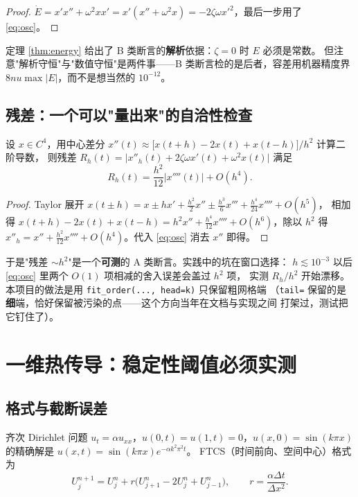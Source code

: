 \begin{proof}
$\dot E=x'x''+\omega^2xx'=x'(x''+\omega^2x)=-2\zeta\omega x'^2$，最后一步用了 \eqref{eq:osc}。
\end{proof}

定理 \ref{thm:energy} 给出了 B 类断言的\textbf{解析}依据：$\zeta=0$ 时 $E$ 必须是常数。
但注意"解析守恒"与"数值守恒"是两件事——B 类断言检的是后者，容差用机器精度界
$8nu\max|E|$，而不是想当然的 $10^{-12}$。

\subsection{残差：一个可以"量出来"的自洽性检查}

\begin{theorem}[中心差分残差的阶]
\label{thm:residual}
设 $x\in C^4$，用中心差分
$x''(t)\approx \bigl[x(t+h)-2x(t)+x(t-h)\bigr]/h^2$ 计算二阶导数，
则残差 $R_h(t)=\bigl|x''_h(t)+2\zeta\omega x'(t)+\omega^2x(t)\bigr|$ 满足
\[
  R_h(t)=\frac{h^2}{12}\bigl|x''''(t)\bigr|+O(h^4).
\]
\end{theorem}

\begin{proof}
Taylor 展开 $x(t\pm h)=x\pm hx'+\tfrac{h^2}{2}x''\pm\tfrac{h^3}{6}x'''+\tfrac{h^4}{24}x''''+O(h^5)$，
相加得 $x(t+h)-2x(t)+x(t-h)=h^2x''+\tfrac{h^4}{12}x''''+O(h^6)$，除以 $h^2$ 得
$x''_h=x''+\tfrac{h^2}{12}x''''+O(h^4)$。代入 \eqref{eq:osc} 消去 $x''$ 即得。
\end{proof}

于是"残差 $\sim h^2$"是一个\textbf{可测}的 A 类断言。实践中的坑在窗口选择：
$h\lesssim10^{-3}$ 以后 \eqref{eq:osc} 里两个 $O(1)$ 项相减的舍入误差会盖过 $h^2$ 项，
实测 $R_h/h^2$ 开始漂移。本项目的做法是用 \texttt{fit\_order(..., head=k)} 只保留粗网格端
（\texttt{tail=} 保留的是\textbf{细}端，恰好保留被污染的点——这个方向当年在文档与实现之间
打架过，测试把它钉住了）。

\section{一维热传导：稳定性阈值必须实测}

\subsection{格式与截断误差}

齐次 Dirichlet 问题 $u_t=\alpha u_{xx}$，$u(0,t)=u(1,t)=0$，$u(x,0)=\sin(k\pi x)$
的精确解是 $u(x,t)=\sin(k\pi x)e^{-\alpha k^2\pi^2 t}$。
FTCS（时间前向、空间中心）格式为
\begin{equation}
  U_j^{n+1}=U_j^n+r\bigl(U_{j+1}^n-2U_j^n+U_{j-1}^n\bigr),\qquad
  r=\frac{\alpha\Delta t}{\Delta x^2}.
  \label{eq:ftcs}
\end{equation}


